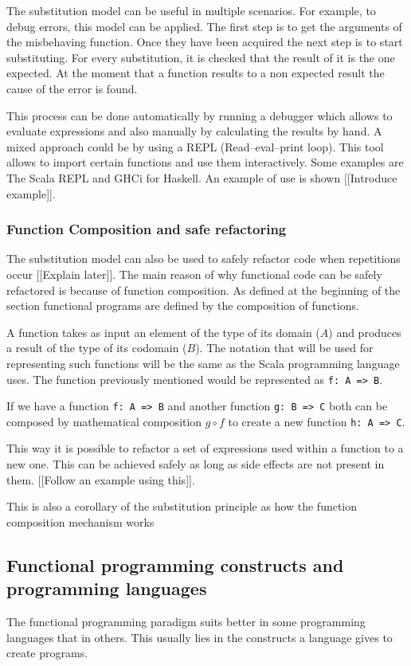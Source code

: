 \documentclass[../main.tex]{subfiles}
\begin{document}
The substitution model can be useful in multiple scenarios. For example, to debug errors, this model can be applied. The first step is to get the arguments of the misbehaving function. Once they have been acquired the next step is to start substituting. For every substitution, it is checked that the result of it is the one expected. At the moment that a function results to a non expected result the cause of the error is found.

This process can be done automatically by running a debugger which allows to evaluate expressions and also manually by calculating the results by hand. A mixed approach could be by using a REPL (Read–eval–print loop). This tool allows to import certain functions and use them interactively. Some examples are The Scala REPL and GHCi for Haskell. An example of use is shown [[Introduce example]].

\subsubsection{Function Composition and safe refactoring}
The substitution model can also be used to safely refactor code when repetitions occur [[Explain later]].  
The main reason of why functional code can be safely refactored is because of function composition. As defined at the beginning of the section functional programs are defined by the composition of functions.

A function takes as input an element of the type of its domain ($A$) and produces a result of the type of its codomain ($B$). The notation that will be used for representing such functions will be the same as the Scala programming language uses. The function previously mentioned would be represented as \texttt{f: A => B}.

If we have a function \texttt{f: A => B} and another function \texttt{g: B => C} both can be composed by mathematical composition $g \circ f$ to create a new function \texttt{h: A => C}.

This way it is possible to refactor a set of expressions used within a function to a new one. This can be achieved safely as long as side effects are not present in them. [[Follow an example using this]].

This is also a corollary of the substitution principle as how the function composition mechanism works

\subsection{Functional programming constructs and programming languages}
The functional programming paradigm suits better in some programming languages that in others. This usually lies in the constructs a language gives to create programs. 
\end{document}
